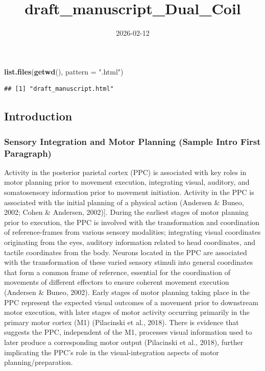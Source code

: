 \documentclass[
]{article}
\title{draft\_manuscript\_Dual\_Coil}
\author{}
\date{\vspace{-2.5em}2026-02-12}
\newenvironment{Shaded}{\begin{snugshade}}{\end{snugshade}}
\newcommand{\AttributeTok}[1]{\textcolor[rgb]{0.13,0.29,0.53}{#1}}
\newcommand{\FunctionTok}[1]{\textcolor[rgb]{0.13,0.29,0.53}{\textbf{#1}}}
\newcommand{\NormalTok}[1]{#1}
\newcommand{\StringTok}[1]{\textcolor[rgb]{0.31,0.60,0.02}{#1}}
\begin{document}
\maketitle

\begin{Shaded}
\begin{Highlighting}[]
\FunctionTok{list.files}\NormalTok{(}\FunctionTok{getwd}\NormalTok{(), }\AttributeTok{pattern =} \StringTok{".html"}\NormalTok{)}
\end{Highlighting}
\end{Shaded}

\begin{verbatim}
## [1] "draft_manuscript.html"
\end{verbatim}

\subsection{Introduction}\label{introduction}

\subsubsection{Sensory Integration and Motor Planning (Sample Intro
First
Paragraph)}\label{sensory-integration-and-motor-planning-sample-intro-first-paragraph}

Activity in the posterior parietal cortex (PPC) is associated with key
roles in motor planning prior to movement execution, integrating visual,
auditory, and somatosensory information prior to movement initiation.
Activity in the PPC is associated with the initial planning of a
physical action (Andersen \& Buneo, 2002; Cohen \& Andersen, 2002){]}.
During the earliest stages of motor planning prior to execution, the PPC
is involved with the transformation and coordination of reference-frames
from various sensory modalities; integrating visual coordinates
originating from the eyes, auditory information related to head
coordinates, and tactile coordinates from the body. Neurons located in
the PPC are associated with the transformation of these varied sensory
stimuli into general coordinates that form a common frame of reference,
essential for the coordination of movements of different effectors to
ensure coherent movement execution (Andersen \& Buneo, 2002). Early
stages of motor planning taking place in the PPC represent the expected
visual outcomes of a movement prior to downstream motor execution, with
later stages of motor activity occurring primarily in the primary motor
cortex (M1) (Pilacinski et al., 2018). There is evidence that suggests
the PPC, independent of the M1, processes visual information used to
later produce a corresponding motor output (Pilacinski et al., 2018),
further implicating the PPC's role in the visual-integration aspects of
motor planning/preparation.
\end{document}

